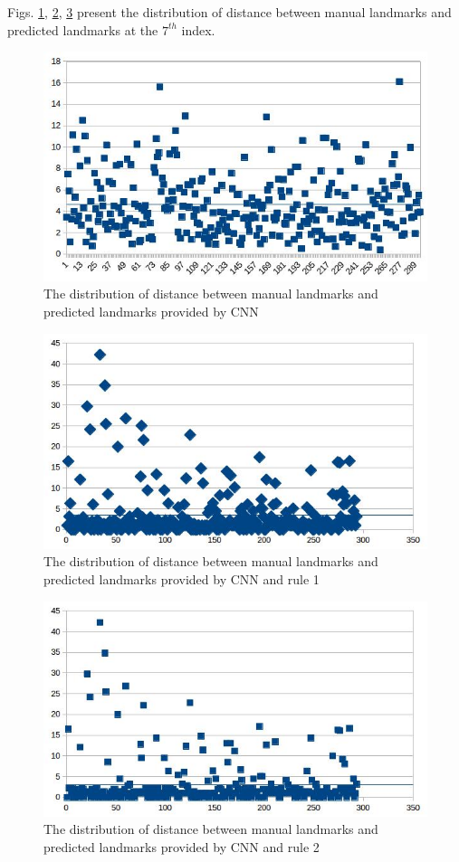 \documentclass[12pt,a4paper]{article}
\begin{document}
Figs. \ref{wellpredicted71}, \ref{wellpredicted72}, \ref{wellpredicted73}  present the distribution of distance between manual landmarks and predicted landmarks at the $7^{th}$ index.
\begin{figure}[h!]
	\centering
	\includegraphics[scale=0.5]{images/dis_lm7_cnn}
	\caption{The distribution of distance between manual landmarks and predicted landmarks provided by CNN}
	\label{wellpredicted71}
\end{figure}
\begin{figure}[h!]
	\centering
	\includegraphics[scale=0.5]{images/dis_lm7_cnn_rule1}
	\caption{The distribution of distance between manual landmarks and predicted landmarks provided by CNN and rule 1}
	\label{wellpredicted72}
\end{figure}
\begin{figure}[h!]
	\centering
	\includegraphics[scale=0.5]{images/dis_lm7_cnn_rule2}
	\caption{The distribution of distance between manual landmarks and predicted landmarks provided by CNN and rule 2}
	\label{wellpredicted73}
\end{figure}
\end{document}
